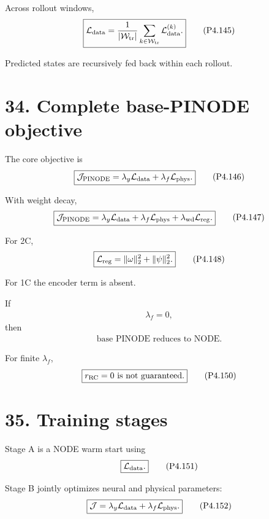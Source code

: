 \documentclass[11pt]{article}
\begin{document}
Across rollout windows,
\begin{align}
\boxed{
\mathcal L_{\rm data}
=
\frac{1}{|\mathcal W_{\rm tr}|}
\sum_{k\in\mathcal W_{\rm tr}}
\mathcal L_{\rm data}^{(k)}.
}
\tag{P4.145}
\end{align}

Predicted states are recursively fed back within each rollout.

\section*{34. Complete base-PINODE objective}

The core objective is
\begin{align}
\boxed{
\mathcal J_{\rm PINODE}
=
\lambda_y\mathcal L_{\rm data}
+
\lambda_f\mathcal L_{\rm phys}.
}
\tag{P4.146}
\end{align}

With weight decay,
\begin{align}
\boxed{
\mathcal J_{\rm PINODE}
=
\lambda_y\mathcal L_{\rm data}
+
\lambda_f\mathcal L_{\rm phys}
+
\lambda_{\rm wd}\mathcal L_{\rm reg}.
}
\tag{P4.147}
\end{align}

For 2C,
\begin{align}
\boxed{
\mathcal L_{\rm reg}
=
\|\omega\|_2^2+\|\psi\|_2^2.
}
\tag{P4.148}
\end{align}

For 1C the encoder term is absent.

If
\begin{align}
\lambda_f=0,
\end{align}
then
\begin{align}
\boxed{\text{base PINODE reduces to NODE.}}
\tag{P4.149}
\end{align}

For finite \(\lambda_f\),
\begin{align}
\boxed{r_{\rm RC}=0\text{ is not guaranteed.}}
\tag{P4.150}
\end{align}

\section*{35. Training stages}

Stage A is a NODE warm start using
\begin{align}
\boxed{\mathcal L_{\rm data}.}
\tag{P4.151}
\end{align}

Stage B jointly optimizes neural and physical parameters:
\begin{align}
\boxed{
\mathcal J
=
\lambda_y\mathcal L_{\rm data}
+
\lambda_f\mathcal L_{\rm phys}.
}
\tag{P4.152}
\end{align}
\end{document}
